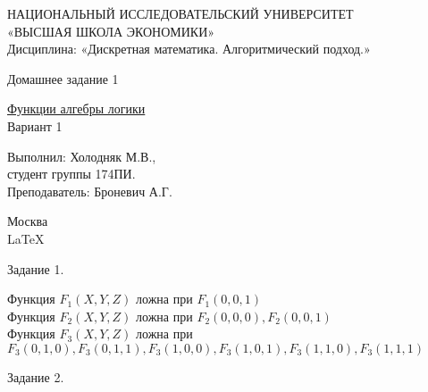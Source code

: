 \documentclass[a4paper,12pt]{report} %
\begin{document}
\begin{titlepage}
\newpage

\begin{center}
{\large НАЦИОНАЛЬНЫЙ ИССЛЕДОВАТЕЛЬСКИЙ УНИВЕРСИТЕТ \\
«ВЫСШАЯ ШКОЛА ЭКОНОМИКИ» 							\\
Дисциплина: «Дискретная математика. Алгоритмический подход.»}

\vfill %

{\large Домашнее задание 1}

\bigskip

\underline{Функции алгебры логики}\\
Вариант 1

\vfill

\begin{flushright}
Выполнил: Холодняк М.В.,\\
студент группы 174ПИ.\medskip \\
Преподаватель: Броневич А.Г.
\end{flushright}

\vfill

Москва \number\year \\
\LaTeX

\end{center}
\end{titlepage}

\newpage

\begin{center}
Задание 1.\\
\end{center}

\begin{flushleft}

Функция $F_1(X,Y,Z)$ ложна при $F_1(0,0,1)$\\
Функция $F_2(X,Y,Z)$ ложна при $F_2(0,0,0), F_2(0,0,1)$\\
Функция $F_3(X,Y,Z)$ ложна при $F_3(0,1,0), F_3(0,1,1), F_3(1,0,0), F_3(1,0,1), F_3(1,1,0), F_3(1,1,1)$\\

\end{flushleft}

\bigskip


\begin{center}
Задание  2.\\
\end{center}

\begin{flushleft}


\end{flushleft}
\end{document}
